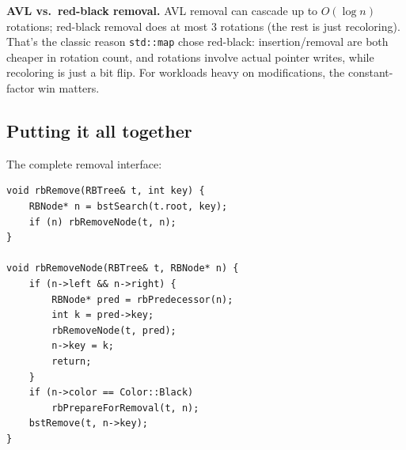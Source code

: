\documentclass[11pt]{article}
\begin{document}
\begin{notebox}
\textbf{AVL vs.\ red-black removal.} AVL removal can cascade up to $O(\log n)$ rotations; red-black removal does at most 3 rotations (the rest is just recoloring). That's the classic reason \texttt{std::map} chose red-black: insertion/removal are both cheaper in rotation count, and rotations involve actual pointer writes, while recoloring is just a bit flip. For workloads heavy on modifications, the constant-factor win matters.
\end{notebox}

\subsection*{Putting it all together}

The complete removal interface:

\begin{lstlisting}[basicstyle=\ttfamily\small,frame=single]
void rbRemove(RBTree& t, int key) {
    RBNode* n = bstSearch(t.root, key);
    if (n) rbRemoveNode(t, n);
}

void rbRemoveNode(RBTree& t, RBNode* n) {
    if (n->left && n->right) {
        RBNode* pred = rbPredecessor(n);
        int k = pred->key;
        rbRemoveNode(t, pred);
        n->key = k;
        return;
    }
    if (n->color == Color::Black)
        rbPrepareForRemoval(t, n);
    bstRemove(t, n->key);
}
\end{lstlisting}
\end{document}
